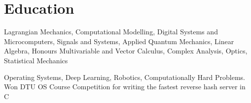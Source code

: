 \documentclass[]{deedy-resume-openfont}
\begin{document}
\vspace{12pt}


\section{Education}

\begin{adjustwidth}{0.55cm}{1.25cm}
   Lagrangian Mechanics, Computational Modelling, Digital Systems and Microcomputers, Signals and Systems, Applied Quantum Mechanics, Linear Algebra, Honours Multivariable and Vector Calculus, Complex Analysis, Optics, Statistical Mechanics
\end{adjustwidth}

\vspace{8pt}

\begin{adjustwidth}{0.55cm}{1.25cm}
   Operating Systems, Deep Learning, Robotics, Computationally Hard Problems. \\
  Won DTU OS Course Competition for writing the fastest reverse hash server in C
\end{adjustwidth}

\vspace{10pt}
\end{document}

